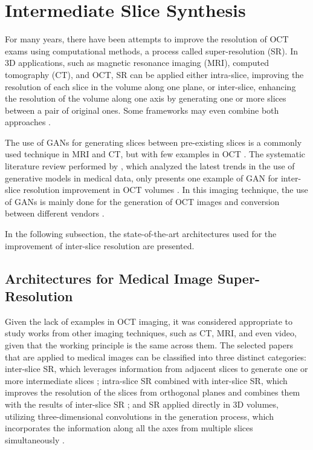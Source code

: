\section{Intermediate Slice Synthesis}
For many years, there have been attempts to improve the resolution of OCT exams using computational methods, a process called super-resolution (SR). In 3D applications, such as magnetic resonance imaging (MRI), computed tomography (CT), and OCT, SR can be applied either intra-slice, improving the resolution of each slice in the volume along one plane, or inter-slice, enhancing the resolution of the volume along one axis by generating one or more slices between a pair of original ones. Some frameworks may even combine both approaches \parencite{You2020}.
\par
The use of GANs for generating slices between pre-existing slices is a commonly used technique in MRI and CT, but with few examples in OCT \parencite{You2020}. The systematic literature review performed by \textcite{Ibrahim2024}, which analyzed the latest trends in the use of generative models in medical data, only presents one example of GAN for inter-slice resolution improvement in OCT volumes \parencite{Lopez2023}. In this imaging technique, the use of GANs is mainly done for the generation of OCT images and conversion between different vendors \parencite{Ibrahim2024}.
\par
In the following subsection, the state-of-the-art architectures used for the improvement of inter-slice resolution are presented.

\subsection{Architectures for Medical Image Super-Resolution}
Given the lack of examples in OCT imaging, it was considered appropriate to study works from other imaging techniques, such as CT, MRI, and even video, given that the working principle is the same across them. The selected papers that are applied to medical images can be classified into three distinct categories: inter-slice SR, which leverages information from adjacent slices to generate one or more intermediate slices \parencite{Lopez2023, Xia2021, Wu2022, Nishimoto2024}; intra-slice SR combined with inter-slice SR, which improves the resolution of the slices from orthogonal planes and combines them with the results of inter-slice SR \parencite{Zhang2024, Peng2020, Fang2022, Nimitha2024, Georgescu2020}; and SR applied directly in 3D volumes, utilizing three-dimensional convolutions in the generation process, which incorporates the information along all the axes from multiple slices simultaneously \parencite{YChen2018, Sanchez2018, Kudo2019, Zhang2022}.
\par

